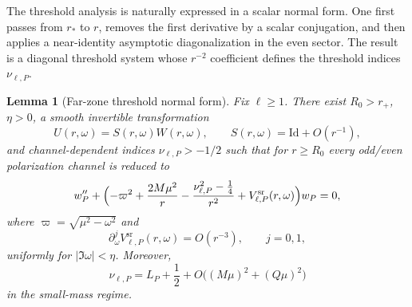 \documentclass[12pt]{article}
\numberwithin{equation}{section}
\theoremstyle{plain}
\newtheorem{lemma}[theorem]{Lemma}
\theoremstyle{definition}
\theoremstyle{remark}
\newcommand{\om}{\omega}
\newcommand{\vp}{\varpi}
\newcommand{\abs}[1]{\left|#1\right|}
\newcommand{\Id}{\mathrm{Id}}
\begin{document}
The threshold analysis is naturally expressed in a scalar normal form.  One first passes from $r_*$ to $r$, removes the first derivative by a scalar conjugation, and then applies a near-identity asymptotic diagonalization in the even sector.  The result is a diagonal threshold system whose $r^{-2}$ coefficient defines the threshold indices $\nu_{\ell,P}$.

\begin{lemma}[Far-zone threshold normal form]\label{lem:normal_form}
Fix $\ell\ge1$.  There exist $R_0>r_+$, $\eta>0$, a smooth invertible transformation
\[
   U(r,\om)=S(r,\om)W(r,\om),
   \qquad
   S(r,\om)=\Id+O(r^{-1}),
\]
and channel-dependent indices $\nu_{\ell,P}>-1/2$ such that for $r\ge R_0$ every odd/even polarization channel is reduced to
\begin{equation}\label{eq:threshold_normal_form}
   w_P''+
   \Bigl(
      -\vp^2
      +\frac{2M\mu^2}{r}
      -\frac{\nu_{\ell,P}^2-\tfrac14}{r^2}
      +V_{\ell,P}^{\mathrm{sr}}(r,\om)
   \Bigr)w_P
   =0,
\end{equation}
where $\vp=\sqrt{\mu^2-\om^2}$ and
\[
   \partial_\om^jV_{\ell,P}^{\mathrm{sr}}(r,\om)=O(r^{-3}),
   \qquad j=0,1,
\]
uniformly for $\abs{\Im\om}<\eta$.  Moreover,
\begin{equation}\label{eq:nu_expansion}
   \nu_{\ell,P}=L_P+\frac12+O\bigl((M\mu)^2+(Q\mu)^2\bigr)
\end{equation}
in the small-mass regime.
\end{lemma}
\end{document}
